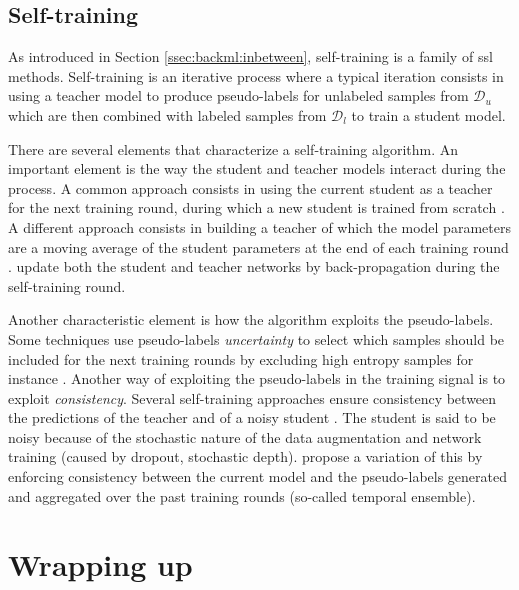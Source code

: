 \subsection{Self-training}
\label{ssec:backml:dl:selftraining}

As introduced in Section \ref{ssec:backml:inbetween}, self-training is a family of \acrlong{ssl} methods. Self-training is an iterative process where a typical iteration consists in using a teacher model to produce pseudo-labels for unlabeled samples from $\mathcal{D}_u$ which are then combined with labeled samples from $\mathcal{D}_l$ to train a student model. 

There are several elements that characterize a self-training algorithm. An important element is the way the student and teacher models interact during the process. A common approach consists in using the current student as a teacher for the next training round, during which a new student is trained from scratch \cite{yarowsky1995unsupervised, xie2020self}. A different approach consists in building a teacher of which the model parameters are a moving average of the student parameters at the end of each training round \cite{tarvainen2017mean}. \citeauthor{pham2021meta} \cite{pham2021meta} update both the student and teacher networks by back-propagation during the self-training round. 

Another characteristic element is how the algorithm exploits the pseudo-labels. Some techniques use pseudo-labels \textit{uncertainty} to select which samples should be included for the next training rounds by excluding high entropy samples for instance \cite{grandvalet2004semi, lee2013pseudo}. Another way of exploiting the pseudo-labels in the training signal is to exploit \textit{consistency}. Several self-training approaches ensure consistency between the predictions of the teacher and of a noisy student \cite{xie2020self, zhu2020improving, sohn2020fixmatch, tarvainen2017mean}. The student is said to be noisy because of the stochastic nature of the data augmentation and network training (\eg caused by dropout, stochastic depth). \citeauthor{laine2016temporal} \cite{laine2016temporal} propose a variation of this by enforcing consistency between the current model and the pseudo-labels generated and aggregated over the past training rounds (so-called temporal ensemble).

\section{Wrapping up}
\label{sec:backml:wrapup}

